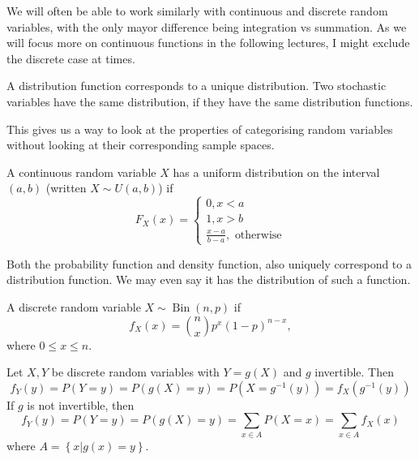 \begin{obs}
	We will often be able to work similarly with continuous and discrete random variables, with the only mayor difference being integration vs summation. As we will focus more on continuous functions in the following lectures, I might exclude the discrete case at times.
\end{obs}



\begin{definition}[Distribution]
	A distribution function corresponds to a unique distribution. Two stochastic variables have the same distribution, if they have the same distribution functions.
\end{definition}

\begin{obs}
	This gives us a way to look at the properties of categorising random variables without looking at their corresponding sample spaces.
\end{obs}

\begin{example}
	A continuous random variable \(X\) has a uniform distribution on the interval \((a, b)\) (written \(X \sim U(a, b)\)) if
	\[
		F_X(x) = \begin{cases} 0, x < a \\ 1, x > b \\ \frac{x-a}{b-a}, \text{ otherwise}   \end{cases} 
	\]
\end{example}

\begin{obs}
	Both the probability function and density function, also uniquely correspond to a distribution function. We may even say it has the distribution of such a function.
\end{obs}

\begin{example}
	A discrete random variable \(X \sim \operatorname{Bin} (n, p)\) if
	\[
		f _X (x)= \binom{n}{x} p ^{x} (1-p) ^{n-x},
	\]
	where \(0 \leq x \leq n \).
	
\end{example}




\begin{theorem} %
	Let \(X, Y\) be discrete random variables with \(Y= g(X)\) and \(g\) invertible. Then
	\[
		f_Y(y) = P(Y = y) = P(g(X) = y) = P(X = g^{-1}(y))=f_X(g^{-1}(y))
	\]
	If \(g\) is not invertible, then
	\[
		f_Y(y) = P(Y = y) =P(g(X) = y) = \sum_{x \in A} P(X = x)=\sum_{x \in A}f_X(x)
	\]
	where \(A = \left\{x | g(x) = y\right\}\).

\end{theorem}

